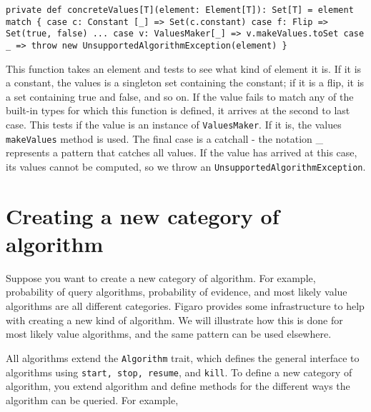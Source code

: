 \begin{flushleft}
\texttt{private def concreteValues[T](element: Element[T]): Set[T] =
element match \{
\newline \tab case c: Constant [\_] => Set(c.constant)
\newline \tab case f: Flip => Set(true, false)
\newline \tab ...
\newline \tab case v: ValuesMaker[\_] => v.makeValues.toSet
\newline \tab case \_ => throw new UnsupportedAlgorithmException(element)
\newline \}
}
\end{flushleft}

This function takes an element and tests to see what kind of element it is. If it is a constant, the values is a singleton set containing the constant; if it is a flip, it is a set containing true and false, and so on. If the value fails to match any of the built-in types for which this function is defined, it arrives at the second to last case. This tests if the value is an instance of \texttt{ValuesMaker}. If it is, the values \texttt{makeValues} method is used. The final case is a catchall - the notation \_ represents a pattern that catches all values. If the value has arrived at this case, its values cannot be computed, so we throw an \texttt{UnsupportedAlgorithmException}.

\section{Creating a new category of algorithm}

Suppose you want to create a new category of algorithm. For example, probability of query algorithms, probability of evidence, and most likely value algorithms are all different categories. Figaro provides some infrastructure to help with creating a new kind of algorithm. We will illustrate how this is done for most likely value algorithms, and the same pattern can be used elsewhere.

All algorithms extend the \texttt{Algorithm} trait, which defines the general interface to algorithms using \texttt{start, stop,  resume}, and \texttt{kill}. To define a new category of algorithm, you extend algorithm and define methods for the different ways the algorithm can be queried. For example,


